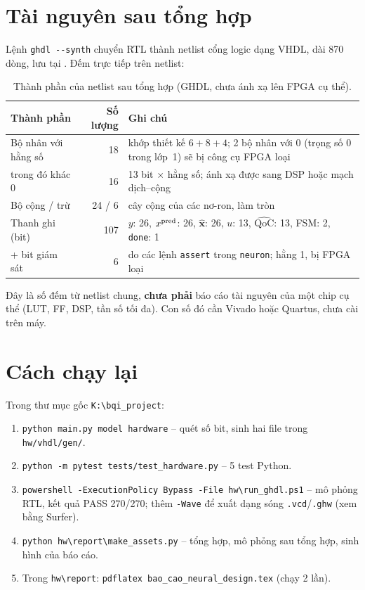 \documentclass[11pt,a4paper]{article}
\newcommand{\QoC}{\mathrm{QoC}}
\newcommand{\xh}{\hat{\mathbf x}}
\newcommand{\code}[1]{\texttt{#1}}
\begin{document}
\section{Tài nguyên sau tổng hợp}

Lệnh \code{ghdl -{}-synth} chuyển RTL thành netlist cổng logic dạng VHDL, dài 870 dòng, lưu tại
. Đếm trực tiếp trên netlist:

\begin{table}[H]
\centering\small
\caption{Thành phần của netlist sau tổng hợp (GHDL, chưa ánh xạ lên FPGA cụ thể).}
\label{tab:synth}
\begin{tabular}{lrp{9.6cm}}
\toprule
Thành phần & Số lượng & Ghi chú \\
\midrule
Bộ nhân với hằng số & 18 & khớp thiết kế $6+8+4$; 2 bộ nhân với 0 (trọng số $0$ trong lớp~1) sẽ bị công cụ FPGA loại \\
\quad trong đó khác 0 & 16 & 13 bit $\times$ hằng số; ánh xạ được sang DSP hoặc mạch dịch--cộng \\
Bộ cộng / trừ & 24 / 6 & cây cộng của các nơ-ron, làm tròn \\
Thanh ghi (bit) & 107 & $y$: 26, $x^{\rm pred}$: 26, $\xh$: 26, $u$: 13, $\widehat{\QoC}$: 13, FSM: 2, \code{done}: 1 \\
\quad + bit giám sát & 6 & do các lệnh \code{assert} trong \code{neuron}; hằng 1, bị FPGA loại \\
\bottomrule
\end{tabular}
\end{table}

Đây là số đếm từ netlist chung, \textbf{chưa phải} báo cáo tài nguyên của một chip cụ thể (LUT, FF, DSP,
tần số tối đa). Con số đó cần Vivado hoặc Quartus, chưa cài trên máy.

\section{Cách chạy lại}

Trong thư mục gốc \code{K:\textbackslash bqi\_project}:
\begin{enumerate}
  \item \code{python main.py model hardware} -- quét số bit, sinh hai file trong \code{hw/vhdl/gen/}.
  \item \code{python -m pytest tests/test\_hardware.py} -- 5 test Python.
  \item \code{powershell -ExecutionPolicy Bypass -File hw\textbackslash run\_ghdl.ps1} -- mô phỏng RTL, kết quả PASS 270/270;
        thêm \code{-Wave} để xuất dạng sóng \code{.vcd}/\code{.ghw} (xem bằng Surfer).
  \item \code{python hw\textbackslash report\textbackslash make\_assets.py} -- tổng hợp, mô phỏng sau tổng hợp, sinh hình của báo cáo.
  \item Trong \code{hw\textbackslash report}: \code{pdflatex bao\_cao\_neural\_design.tex} (chạy 2 lần).
\end{enumerate}
\end{document}
